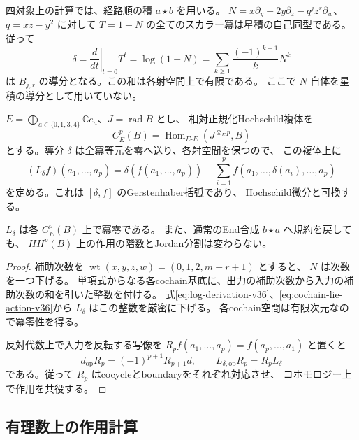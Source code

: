 四対象上の計算では、経路順の積 $a\star b$ を用いる。
$N=x\partial_y+2y\partial_z-q^jz^r\partial_w$、$q=xz-y^2$ に対して
$T=1+N$ の全てのスカラー冪は星積の自己同型である。
従って
\begin{equation}
 \delta=\left.\frac{d}{dt}\right|_{t=0}T^t
       =\log(1+N)
       =\sum_{k\ge1}\frac{(-1)^{k+1}}{k}N^k
 \label{eq:log-derivation-v36}
\end{equation}
は $B_{j,r}$ の導分となる。この和は各射空間上で有限である。
ここで $N$ 自体を星積の導分として用いていない。

$E=\bigoplus_{a\in\{0,1,3,4\}}\mathbb C e_a$、$J=\operatorname{rad}B$ とし、
相対正規化Hochschild複体を
\[
 C_E^p(B)=\operatorname{Hom}_{E\text{-}E}(J^{\otimes_E p},B)
\]
とする。導分 $\delta$ は全冪等元を零へ送り、各射空間を保つので、
この複体上に
\begin{equation}
 (L_\delta f)(a_1,\ldots,a_p)
 =\delta(f(a_1,\ldots,a_p))
 -\sum_{i=1}^p f(a_1,\ldots,\delta(a_i),\ldots,a_p)
 \label{eq:cochain-lie-action-v36}
\end{equation}
を定める。これは $[\delta,f]$ のGerstenhaber括弧であり、
Hochschild微分と可換する。

\begin{lemma}[冪零性と合成規約]
\label{lem:log-action-nilpotent-v36}
$L_\delta$ は各 $C_E^p(B)$ 上で冪零である。
また、通常のEnd合成 $b\star a$ へ規約を戻しても、
$HH^p(B)$ 上の作用の階数とJordan分割は変わらない。
\end{lemma}

\begin{proof}
補助次数を $\operatorname{wt}(x,y,z,w)=(0,1,2,m+r+1)$ とすると、
$N$ は次数を一つ下げる。
単項式からなる各cochain基底に、出力の補助次数から入力の補助次数の和を引いた整数を付ける。
式\eqref{eq:log-derivation-v36}、\eqref{eq:cochain-lie-action-v36}から
$L_\delta$ はこの整数を厳密に下げる。
各cochain空間は有限次元なので冪零性を得る。

反対代数上で入力を反転する写像を
$R_p f(a_1,\ldots,a_p)=f(a_p,\ldots,a_1)$ と置くと
\[
 d_{\mathrm{op}}R_p=(-1)^{p+1}R_{p+1}d,
 \qquad L_{\delta,\mathrm{op}}R_p=R_pL_\delta
\]
である。従って $R_p$ はcocycleとboundaryをそれぞれ対応させ、
コホモロジー上で作用を共役する。
\end{proof}

\subsection{有理数上の作用計算}

